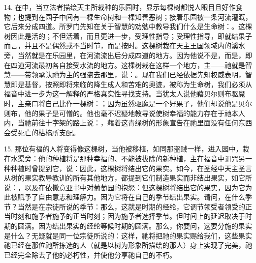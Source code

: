 14. 在中，当立法者描绘天主所栽种的乐园时，显示每棵树都悦人眼目且好作食物；也提到在园子中间有一棵生命树和一棵知善恶树；接着乐园被一条河流灌溉，它后来分成四道。所罗门先知在关于智慧的劝勉中教导我们什么是生命树：。这棵树因此是活的；不但活着，而且更进一步，受理性指导；受理性指导，即就结果子而言，并且不是偶然或不当时节，而是按时。这棵树栽在天主王国领域内的溪水旁，当然就是在乐园里，在河流流出后分成四道的地方。因为他说不是，而是，即在四道河流最初各自接受水流的地方。这棵树栽在这样一个地方，主——祂就是智慧——带领承认祂为主的强盗去那里，说：。现在我们已经依据先知权威表明，智慧即是基督，按照即将来临的降生成人和苦难的奥迹，被称为生命树，我们必须从福音中进一步为这一解释的严格真实性寻找支持。当犹太人说他藉贝尔则布驱魔时，主亲口将自己比作一棵树：；因为虽然驱魔是一个好果子，他们却说他是贝尔则布，他的果子是可憎的。他也毫不迟疑地教导说使树幸福的能力存在于祂本人内，当祂前往十字架的路上说：，藉着这青绿树的形象宣告在祂里面没有任何东西会受死亡的枯槁所支配。\par

15. 那位有福的人将变得像这棵树，当他被移植，如同那盗贼一样，进入园中，栽在水渠旁：他的种植将是那种幸福的、不能被拔除的新种植，主在福音中诅咒另一种种植时曾提到它，说：因此，这棵树将结出它的果实。如今，在圣经中天主圣言从树的果实教导教训的所有其他地方，都提到它们制造果实而非结出果实，如它所说：，以及在依撒意亚书中对葡萄园的抱怨：但这棵树将结出它的果实，因为它为此被赋予了自由意志和理解力。因为它将在自己的季节结出果实。请问，在什么季节？当然是在宗徒所说的季节：那么，这就是时期的经纶，它调节领受者领受的正当时刻和施予者施予的正当时刻；因为施予者选择季节。但时间上的延迟取决于时期的圆满。因为结出果实的经纶等候时期的圆满。那么，你要问，这要分施的果实是什么？无疑就是同一位宗徒所说的：这样，祂将把祂的果实赐给我们，这些果实祂已经在那位祂所拣选的人（就是以树为形象所描绘的那人）身上实现了完美，祂已经完全除去了他的必朽性，并使他分享祂自己的不朽。\par

